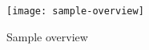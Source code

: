 \documentclass[../manifest.tex]{subfiles}
\begin{document}
%
%
%
%
%
%
%
%
%
%
%

\begin{figure}[h]
  \centering
  \texttt{[image: sample-overview]}
  \caption{Sample overview}
  \label{fig:sample-overview}
\end{figure}
\end{document}
